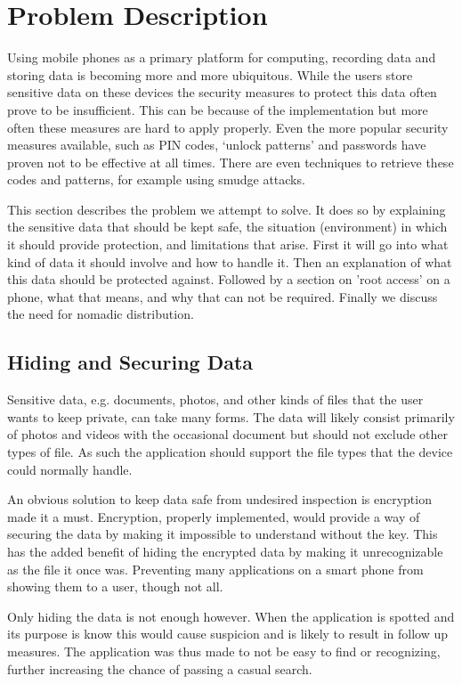 \section{Problem Description}
\label{sec:problem-description}
Using mobile phones as a primary platform for computing, recording data and storing data is becoming more and more ubiquitous.
While the users store sensitive data on these devices the security measures to protect this data often prove to be insufficient.
This can be because of the implementation but more often these measures are hard to apply properly.
Even the more popular security measures available, such as PIN codes, `unlock patterns' and passwords have proven not to be effective at all times.
There are even techniques to retrieve these codes and patterns, for example using smudge attacks\cite{aviv2010smudge}.

This section describes the problem we attempt to solve.
It does so by explaining the sensitive data that should be kept safe, the situation (environment) in which it should provide protection, and limitations that arise. 
First it will go into what kind of data it should involve and how to handle it. 
Then an explanation of what this data should be protected against. 
Followed by a section on 'root access' on a phone, what that means, and why that can not be required.
Finally we discuss the need for nomadic distribution.

\subsection{Hiding and Securing Data}
Sensitive data, e.g. documents, photos, and other kinds of files that the user wants to keep private, can take many forms.
The data will likely consist primarily of photos and videos with the occasional document but should not exclude other types of file.
As such the application should support the file types that the device could normally handle.

An obvious solution to keep data safe from undesired inspection is encryption made it a must.
Encryption, properly implemented, would provide a way of securing the data by making it impossible to understand without the key. 
This has the added benefit of hiding the encrypted data by making it unrecognizable as the file it once was.
Preventing many applications on a smart phone from showing them to a user, though not all.

Only hiding the data is not enough however.
When the application is spotted and its purpose is know this would cause suspicion and is likely to result in follow up measures.
The application was thus made to not be easy to find or recognizing, further increasing the chance of passing a casual search.

